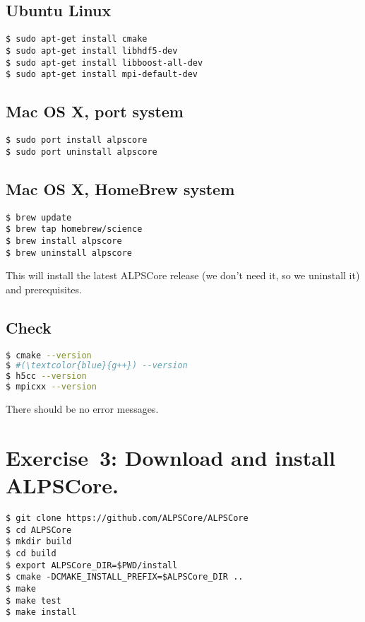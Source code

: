 \documentclass[12pt]{article}
\begin{document}
\subsection*{Ubuntu Linux}
\begin{lstlisting}[emph={sudo,apt,get}]
$ sudo apt-get install cmake
$ sudo apt-get install libhdf5-dev
$ sudo apt-get install libboost-all-dev
$ sudo apt-get install mpi-default-dev
\end{lstlisting}%
\subsection*{Mac OS X, port system}
\begin{lstlisting}[emph={port,sudo}]
$ sudo port install alpscore
$ sudo port uninstall alpscore
\end{lstlisting}%
\subsection*{Mac OS X, HomeBrew system}
\begin{lstlisting}[emph={brew}]
$ brew update
$ brew tap homebrew/science
$ brew install alpscore
$ brew uninstall alpscore
\end{lstlisting}%

This will install the latest ALPSCore release (we don't need it, so we
uninstall it) and prerequisites.

\subsection*{Check}
\begin{lstlisting}[language=sh,basicstyle=\ttfamily\small,emph={cmake,gcc,h5cc,mpicxx}]
$ cmake --version
$ #(\textcolor{blue}{g++}) --version
$ h5cc --version
$ mpicxx --version
\end{lstlisting}

There should be no error messages.

\section*{Exercise~3: Download and install ALPSCore.}
\begin{lstlisting}[emph={git,export,cmake,make,cd,mkdir}]
$ git clone https://github.com/ALPSCore/ALPSCore
$ cd ALPSCore
$ mkdir build
$ cd build
$ export ALPSCore_DIR=$PWD/install
$ cmake -DCMAKE_INSTALL_PREFIX=$ALPSCore_DIR ..
$ make
$ make test
$ make install
\end{lstlisting}%
\end{document}
